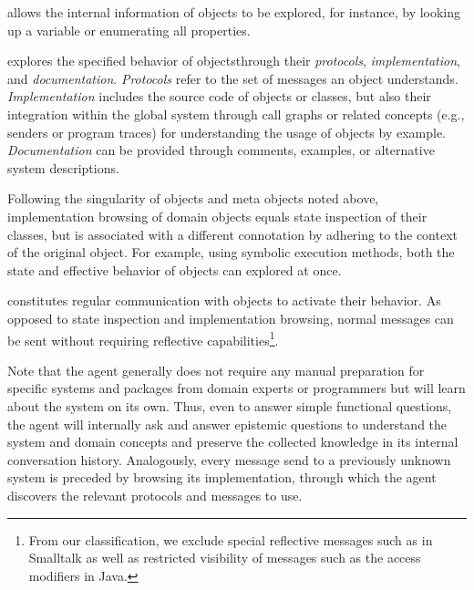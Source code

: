 \begin{description}[noextralabelsep]
	\item[State inspection] allows the internal information of objects to be explored, for instance, by looking up a variable or enumerating all properties.
	\item[Implementation browsing] explores the specified behavior of objects\linebreak{}through their \emph{protocols}, \emph{implementation}, and \emph{documentation}.
	\emph{Protocols} refer to the set of messages an object understands.
	\emph{Implementation} includes the source code of objects or classes, but also their integration within the global system through call graphs or related concepts (e.g., senders or program traces) for understanding the usage of objects by example.
	\emph{Documentation} can be provided through comments, examples, or alternative system descriptions.

	Following the singularity of objects and meta objects noted above, implementation browsing of domain objects equals state inspection of their classes, but is associated with a different connotation by adhering to the context of the original object.
	For example, using symbolic execution methods, both the state and effective behavior of objects can explored at once.
	\item[Message sending] constitutes regular communication with objects to activate their behavior.
	As opposed to state inspection and implementation browsing, normal messages can be sent without requiring reflective capabilities\footnote{From our classification, we exclude special reflective messages such as  in Smalltalk as well as restricted visibility of messages such as the  access modifiers in Java.}.
\end{description}

Note that the agent generally does not require any manual preparation for specific systems and packages from domain experts or programmers but will learn about the system on its own.
Thus, even to answer simple functional questions, the agent will internally ask and answer epistemic questions to understand the system and domain concepts and preserve the collected knowledge in its internal conversation history.
Analogously, every message send to a previously unknown system is preceded by browsing its implementation, through which the agent discovers the relevant protocols and messages to use.

